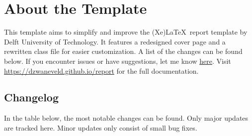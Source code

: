\chapter{About the Template}
\label{chapter:title}

This template aims to simplify and improve the (Xe)\LaTeX~report template by Delft University of Technology. It features a redesigned cover page and a rewritten class file for easier customization. A list of the changes can be found below. If you encounter issues or have suggestions, let me know \underline{\href{https://github.com/dzwaneveld/TU-Delft-Unofficial-Report-Template/issues}{here}}. Visit \url{https://dzwaneveld.github.io/report} for the full documentation.

\section{Changelog}

In the table below, the most notable changes can be found. Only major updates are tracked here. Minor updates only consist of small bug fixes.

